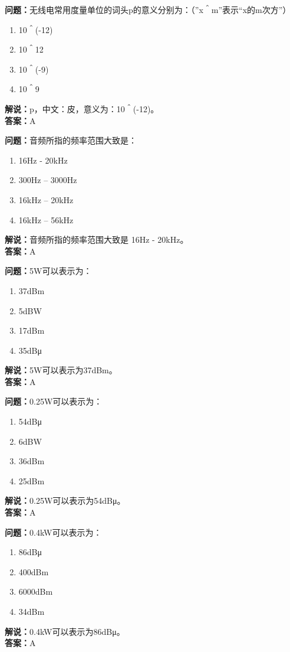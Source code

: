 \documentclass{ctexbook}%
\begin{document}
\textbf{问题：}无线电常用度量单位的词头p的意义分别为：（”x＾m”表示“x的m次方”）
\begin{enumerate}[label=\Alph*), leftmargin=3em]
\item 10＾(-12)
\item 10＾12
\item 10＾(-9)
\item 10＾9
\end{enumerate}
\textbf{解说：}p，中文：皮，意义为：10＾(-12)。\\
\textbf{答案：}A

\textbf{问题：}音频所指的频率范围大致是：
\begin{enumerate}[label=\Alph*), leftmargin=3em]
\item 16Hz - 20kHz
\item 300Hz – 3000Hz
\item 16kHz – 20kHz
\item 16kHz – 56kHz
\end{enumerate}
\textbf{解说：}音频所指的频率范围大致是 16Hz - 20kHz。\\  %
\textbf{答案：}A

\textbf{问题：}5W可以表示为：
\begin{enumerate}[label=\Alph*), leftmargin=3em]
\item 37dBm
\item 5dBW
\item 17dBm
\item 35dBμ
\end{enumerate}
\textbf{解说：}5W可以表示为37dBm。\\
\textbf{答案：}A

\textbf{问题：}0.25W可以表示为：
\begin{enumerate}[label=\Alph*), leftmargin=3em]
\item 54dBμ
\item 6dBW
\item 36dBm
\item 25dBm
\end{enumerate}
\textbf{解说：}0.25W可以表示为54dBμ。\\
\textbf{答案：}A

\textbf{问题：}0.4kW可以表示为：
\begin{enumerate}[label=\Alph*), leftmargin=3em]
\item 86dBμ
\item 400dBm
\item 6000dBm
\item 34dBm
\end{enumerate}
\textbf{解说：}0.4kW可以表示为86dBμ。\\
\textbf{答案：}A
\end{document}
